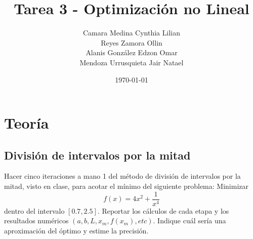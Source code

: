 \documentclass[12pt,oneside]{book}
\title{Tarea 3 - Optimización no Lineal}
\author{Camara Medina Cynthia Lilian \\
Reyes Zamora Ollin \\
Alanis González Edzon Omar \\
Mendoza Urrusquieta Jair Natael}
\date{\today}
\begin{document}
\maketitle
\tableofcontents
\chapter{Teoría}
\section{División de intervalos por la mitad}
Hacer cinco iteraciones a mano 1 del método de división de intervalos por la mitad, visto en clase, para acotar el mínimo del siguiente problema:
Minimizar \[f(x)=4x^2+\frac{1}{x^4}\] dentro del intervalo $[0.7,2.5]$. Reportar los cálculos de cada etapa y los resultados numéricos $(a,b,L,x_m,f(x_m),etc)$. Indique cuál sería una aproximación del
óptimo y estime la precisión.
\end{document}

